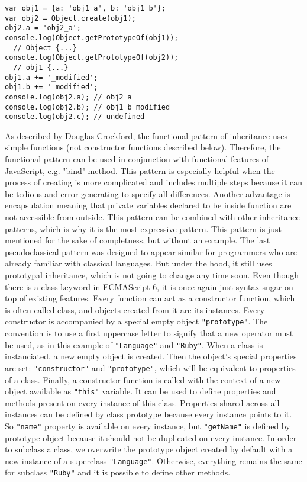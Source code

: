 \documentclass{bioinfo}
\begin{document}
\begin{lstlisting}
var obj1 = {a: 'obj1_a', b: 'obj1_b'};
var obj2 = Object.create(obj1);
obj2.a = 'obj2_a';
console.log(Object.getPrototypeOf(obj1)); 
  // Object {...}
console.log(Object.getPrototypeOf(obj2)); 
  // obj1 {...}
obj1.a += '_modified';
obj1.b += '_modified';
console.log(obj2.a); // obj2_a
console.log(obj2.b); // obj1_b_modified
console.log(obj2.c); // undefined
\end{lstlisting}

As described by Douglas Crockford, the functional pattern of inheritance uses simple functions (not constructor functions described below).  Therefore, the functional pattern can be used in conjunction with functional features of JavaScript, e.g. "bind" method.
This pattern is especially helpful when the process of creating is more complicated and includes multiple steps because it can be tedious and error generating to specify all differences. Another advantage is encapsulation meaning that private variables declared to be inside function are not accessible from outside. This pattern can be combined with other inheritance patterns, which is why it is the most expressive pattern. This pattern is just mentioned for the sake of completness, but without an example.
The last pseudoclassical pattern was designed to appear similar for programmers who are already familiar with classical languages. But under the hood, it still uses prototypal inheritance, which is not going to change any time soon. Even though there is a class keyword in ECMAScript 6, it is once again just syntax sugar on top of existing features.
Every function can act as a constructor function, which is often called class, and objects created from it are its instances. Every constructor is accompanied by a special empty object \texttt{"prototype"}. The convention is to use a first uppercase letter to signify that a new operator must be used, as in this example of \texttt{"Language"} and \texttt{"Ruby"}. When a class is instanciated, a new empty object is created. Then the object's special properties are set: \texttt{"constructor"} and \texttt{"prototype"}, which will be equivalent to properties of a class. Finally, a constructor function is called with the context of a new object available as \texttt{"this"} variable. It can be used to define properties and methods present on every instance of this class. Properties shared across all instances can be defined by class prototype because every instance points to it. So \texttt{"name"} property is available on every instance, but \texttt{"getName"} is defined by prototype object because it should not be duplicated on every instance. In order to subclass a class, we overwrite the prototype object created by default with a new instance of a superclass \texttt{"Language"}. Otherwise, everything remains the same for subclass \texttt{"Ruby"} and it is possible to define other methods.
\end{document}
